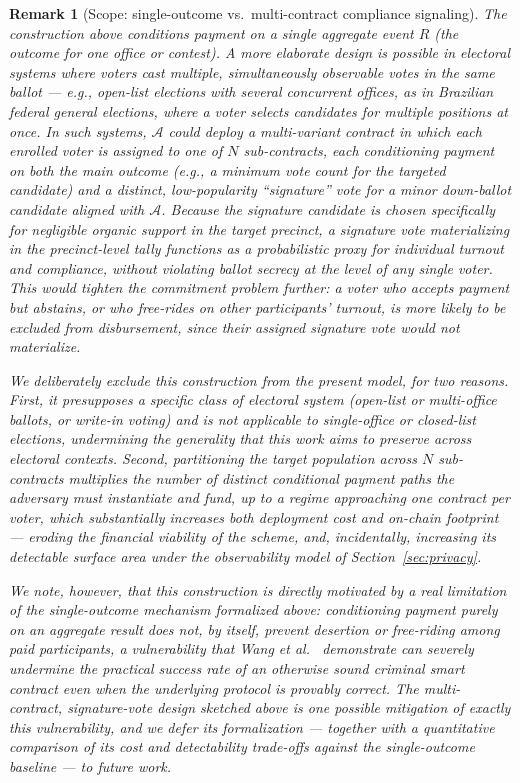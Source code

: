 \documentclass[journal,onecolumn,11pt]{IEEEtran}
\newtheorem{remark}{Remark}
\begin{document}
\begin{remark}[Scope: single-outcome vs.\ multi-contract compliance signaling]
\label{rem:scope-single-outcome}
The construction above conditions payment on a single aggregate event $R$ (the
outcome for one office or contest). A more elaborate design is possible in
electoral systems where voters cast multiple, simultaneously observable votes
in the same ballot --- e.g., open-list elections with several concurrent
offices, as in Brazilian federal general elections, where a voter selects
candidates for multiple positions at once. In such systems, $\mathcal{A}$
could deploy a \emph{multi-variant} contract in which each enrolled voter is
assigned to one of $N$ sub-contracts, each conditioning payment on both the
main outcome (e.g., a minimum vote count for the targeted candidate) and a
distinct, low-popularity ``signature'' vote for a minor down-ballot candidate
aligned with $\mathcal{A}$. Because the signature candidate is chosen
specifically for negligible organic support in the target precinct, a
signature vote materializing in the precinct-level tally functions as a
probabilistic proxy for individual turnout and compliance, without violating
ballot secrecy at the level of any single voter. This would tighten the
commitment problem further: a voter who accepts payment but abstains, or who
free-rides on other participants' turnout, is more likely to be excluded from
disbursement, since their assigned signature vote would not materialize.

We deliberately exclude this construction from the present model, for two
reasons. First, it presupposes a specific class of electoral system (open-list
or multi-office ballots, or write-in voting) and is not applicable to
single-office or closed-list elections, undermining the generality that this
work aims to preserve across electoral contexts. Second, partitioning the
target population across $N$ sub-contracts multiplies the number of
distinct conditional payment paths the adversary must instantiate and fund,
up to a regime approaching one contract per voter, which substantially
increases both deployment cost and on-chain footprint --- eroding the
financial viability of the scheme, and, incidentally, increasing its
detectable surface area under the observability model of
Section~\ref{sec:privacy}. 

We note, however, that this construction is directly motivated by a real
limitation of the single-outcome mechanism formalized above: conditioning
payment purely on an aggregate result does not, by itself, prevent
desertion or free-riding among paid participants, a vulnerability that
Wang et al.~\cite{wang2019randomness} demonstrate can severely undermine the
practical success rate of an otherwise sound criminal smart contract even
when the underlying protocol is provably correct. The multi-contract,
signature-vote design sketched above is one possible mitigation of exactly
this vulnerability, and we defer its formalization --- together with a
quantitative comparison of its cost and detectability trade-offs against the
single-outcome baseline --- to future work.
\end{remark}
\end{document}
